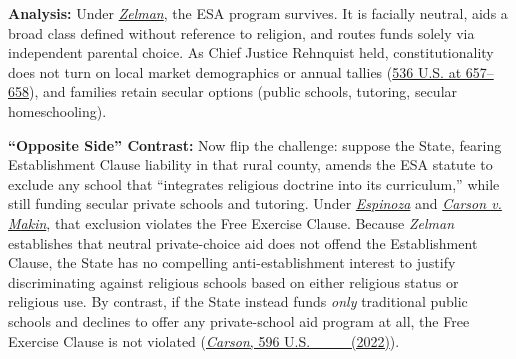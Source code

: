 \documentclass[12pt]{article}
\begin{document}
\textbf{Analysis:} Under \href{https://supreme.justia.com/cases/federal/us/536/639/}{\emph{Zelman}}, the ESA program survives. It is facially neutral, aids a broad class defined without reference to religion, and routes funds solely via independent parental choice. As Chief Justice Rehnquist held, constitutionality does not turn on local market demographics or annual tallies (\href{https://supreme.justia.com/cases/federal/us/536/639/}{536 U.S. at 657--658}), and families retain secular options (public schools, tutoring, secular homeschooling).

\textbf{``Opposite Side'' Contrast:} Now flip the challenge: suppose the State, fearing Establishment Clause liability in that rural county, amends the ESA statute to exclude any school that ``integrates religious doctrine into its curriculum,'' while still funding secular private schools and tutoring. Under \href{https://supreme.justia.com/cases/federal/us/591/18-1195/}{\emph{Espinoza}} and \href{https://supreme.justia.com/cases/federal/us/596/20-1088/}{\emph{Carson v. Makin}}, that exclusion violates the Free Exercise Clause. Because \emph{Zelman} establishes that neutral private-choice aid does not offend the Establishment Clause, the State has no compelling anti-establishment interest to justify discriminating against religious schools based on either religious status or religious use. By contrast, if the State instead funds \emph{only} traditional public schools and declines to offer any private-school aid program at all, the Free Exercise Clause is not violated (\href{https://supreme.justia.com/cases/federal/us/596/20-1088/}{\emph{Carson}, 596 U.S. \_\_\_ (2022)}).
\end{document}
